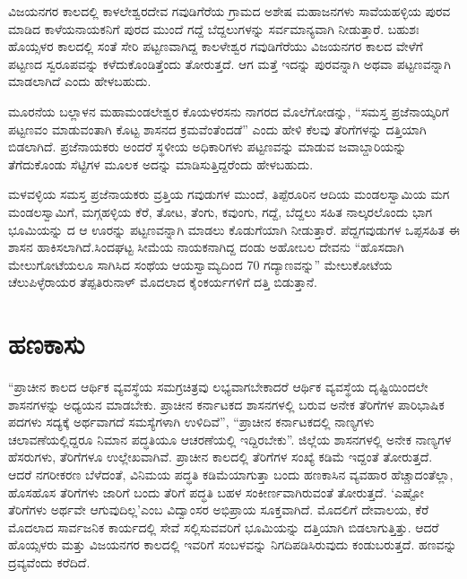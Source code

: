 ವಿಜಯನಗರ ಕಾಲದಲ್ಲಿ ಕಾಳಲೇಶ್ವರದೇವ ಗವುಡಿಗೆರೆಯ ಗ್ರಾಮದ ಅಶೇಷ ಮಹಾಜನಗಳು ಸಾವೆಯಹಳ್ಳಿಯ ಪುರವ ಮಾಡಿದ ಕಾಳೆಯನಾಯಕನಿಗೆ ಪುರದ ಮುಂದೆ ಗದ್ದೆ ಬೆದ್ದಲುಗಳನ್ನು ಸರ್ವಮಾನ್ಯವಾಗಿ ನೀಡುತ್ತಾರೆ. ಬಹುಶಃ ಹೊಯ್ಸಳರ ಕಾಲದಲ್ಲಿ ಸಂತೆ ಸೇರಿ ಪಟ್ಟಣವಾಗಿದ್ದ ಕಾಲಳೇಶ್ವರ ಗವುಡಿಗೆರೆಯು ವಿಜಯನಗರ ಕಾಲದ ವೇಳೆಗೆ ಪಟ್ಟಣದ ಸ್ವರೂಪವನ್ನು ಕಳೆದುಕೊಂಡಿತ್ತೆಂದು ತೋರುತ್ತದೆ. ಆಗ ಮತ್ತೆ ಇದನ್ನು ಪುರವನ್ನಾಗಿ ಅಥವಾ ಪಟ್ಟಣವನ್ನಾಗಿ ಮಾಡಲಾಗಿದೆ ಎಂದು ಹೇಳಬಹುದು.

ಮೂರನೆಯ ಬಲ್ಲಾಳನ ಮಹಾಮಂಡಲೇಶ್ವರ ಕೊಯಳರಸನು ನಾಗರದ ಮೊಲೆಗೋಡನ್ನು, “ಸಮಸ್ತ ಪ್ರಜೆನಾಯ್ಕರಿಗೆ ಪಟ್ಟಣವಂ ಮಾಡುವಂತಾಗಿ ಕೊಟ್ಟ ಶಾಸನದ ಕ್ರಮವೆಂತೆಂದಡೆ” ಎಂದು ಹೇಳಿ ಕೆಲವು ತೆರಿಗೆಗಳನ್ನು ದತ್ತಿಯಾಗಿ ಬಿಡಲಾಗಿದೆ. ಪ್ರಜೆನಾಯಕರು ಅಂದರೆ ಸ್ಥಳೀಯ ಅಧಿಕಾರಿಗಳು ಪಟ್ಟಣವನ್ನು ಮಾಡುವ ಜವಾಬ್ದಾರಿಯನ್ನು ತೆಗೆದುಕೊಂಡು ಸೆಟ್ಟಿಗಳ ಮೂಲಕ ಅದನ್ನು ಮಾಡಿಸುತ್ತಿದ್ದರೆಂದು ಹೇಳಬಹುದು.

ಮಳವಳ್ಳಿಯ ಸಮಸ್ತ ಪ್ರಜೆನಾಯಕರು ವ್ರತ್ತಿಯ ಗವುಡುಗಳ ಮುಂದೆ, ತಿಪ್ಪೆರೂರಿನ ಆದಿಯ ಮಂಡಲಸ್ವಾಮಿಯ ಮಗ ಮಂಡಲಸ್ವಾಮಿಗೆ, ಮಗ್ಗಹಳ್ಳಿಯ ಕೆರೆ, ತೋಟ, ತೆಂಗು, ಕವುಂಗು, ಗದ್ದೆ, ಬೆದ್ದಲು ಸಹಿತ ನಾಲ್ಕರಲೊಂದು ಭಾಗ ಭೂಮಿಯನ್ನು ದ ಆ ಊರನ್ನು ಪಟ್ಟಣವನ್ನಾಗಿ ಮಾಡಲು ಕೊಡುಗೆಯಾಗಿ ನೀಡುತ್ತಾರೆ. ಪೆದ್ದಗವುಡುಗಳ ಒಪ್ಪಸಹಿತ ಈ ಶಾಸನ ಹಾಕಿಸಲಾಗಿದೆ.ಸಿಂದಘಟ್ಟ ಸೀಮೆಯ ನಾಯಕನಾಗಿದ್ದ ದಂಡು ಅಹೋಬಲ ದೇವನು “ಹೊಸದಾಗಿ ಮೇಲುಗೋಟೆಯಲೂ ಸಾಗಿಸಿದ ಸಂಥೆಯ ಆಯಸ್ವಾಮ್ಯದಿಂದ 70 ಗದ್ಯಾಣವನ್ನು” ಮೇಲುಕೋಟೆಯ ಚೆಲುಪಿಳ್ಳೆರಾಯರ ತೆಪ್ಪತಿರುನಾಳ್​ ಮೊದಲಾದ ಕೈಂಕರ್ಯಗಳಿಗೆ ದತ್ತಿ ಬಿಡುತ್ತಾನೆ.


\section{ಹಣಕಾಸು}

“ಪ್ರಾಚೀನ ಕಾಲದ ಆರ್ಥಿಕ ವ್ಯವಸ್ಥೆಯ ಸಮಗ್ರಚಿತ್ರವು ಲಭ್ಯವಾಗಬೇಕಾದರೆ ಆರ್ಥಿಕ ವ್ಯವಸ್ಥೆಯ ದೃಷ್ಟಿಯಿಂದಲೇ ಶಾಸನಗಳನ್ನು ಅಧ್ಯಯನ ಮಾಡಬೇಕು. ಪ್ರಾಚೀನ ಕರ್ನಾಟಕದ ಶಾಸನಗಳಲ್ಲಿ ಬರುವ ಅನೇಕ ತೆರಿಗೆಗಳ ಪಾರಿಭಾಷಿಕ ಪದಗಳು ಸದ್ಯಕ್ಕೆ ಅರ್ಥವಾಗದೆ ಸಮಸ್ಯೆಗಳಾಗಿ ಉಳಿದಿವೆ”, “ಪ್ರಾಚೀನ ಕರ್ನಾಟಕದಲ್ಲಿ ನಾಣ್ಯಗಳು ಚಲಾವಣೆಯಲ್ಲಿದ್ದರೂ ನಿಮಾನ ಪದ್ಧತಿಯೂ ಆಚರಣೆಯಲ್ಲಿ ಇದ್ದಿರಬೇಕು”. ಜಿಲ್ಲೆಯ ಶಾಸನಗಳಲ್ಲಿ ಅನೇಕ ನಾಣ್ಯಗಳ ಹೆಸರುಗಳು, ತೆರಿಗೆಗಳೂ ಉಲ್ಲೇಖವಾಗಿವೆ. ಪ್ರಾಚೀನ ಕಾಲದಲ್ಲಿ ತೆರಿಗೆಗಳ ಸಂಖ್ಯೆ ಕಡಿಮೆ ಇದ್ದಂತೆ ತೋರುತ್ತದೆ. ಆದರೆ ನಗರೀಕರಣ ಬೆಳೆದಂತೆ, ವಿನಿಮಯ ಪದ್ಧತಿ ಕಡಿಮೆಯಾಗುತ್ತಾ ಬಂದು ಹಣಕಾಸಿನ ವ್ಯವಹಾರ ಹೆಚ್ಚಾದಂತೆಲ್ಲಾ, ಹೊಸಹೊಸ ತೆರಿಗೆಗಳು ಜಾರಿಗೆ ಬಂದು ತೆರಿಗೆ ಪದ್ಧತಿ ಬಹಳ ಸಂಕೀರ್ಣವಾಗಿರುವಂತೆ ತೋರುತ್ತದೆ. ‘ಎಷ್ಟೋ ತೆರಿಗೆಗಳು ಅರ್ಥವೇ ಆಗುವುದಿಲ್ಲ’ಎಂಬ ವಿದ್ವಾಂಸರ ಅಭಿಪ್ರಾಯ ಸೂಕ್ತವಾಗಿದೆ. ಮೊದಲಿಗೆ ದೇವಾಲಯ, ಕೆರೆ ಮೊದಲಾದ ಸಾರ್ವಜನಿಕ ಕಾರ್ಯದಲ್ಲಿ ಸೇವೆ ಸಲ್ಲಿಸುವವರಿಗೆ ಭೂಮಿಯನ್ನು ದತ್ತಿಯಾಗಿ ಬಿಡಲಾಗುತ್ತಿತ್ತು. ಆದರೆ ಹೊಯ್ಸಳರು ಮತ್ತು ವಿಜಯನಗರ ಕಾಲದಲ್ಲಿ ಇವರಿಗೆ ಸಂಬಳವನ್ನು ನಿಗದಿಪಡಿಸಿರುವುದು ಕಂಡುಬರುತ್ತದೆ. ಹಣವನ್ನು ದ್ರವ್ಯವೆಂದು ಕರೆದಿದೆ.


